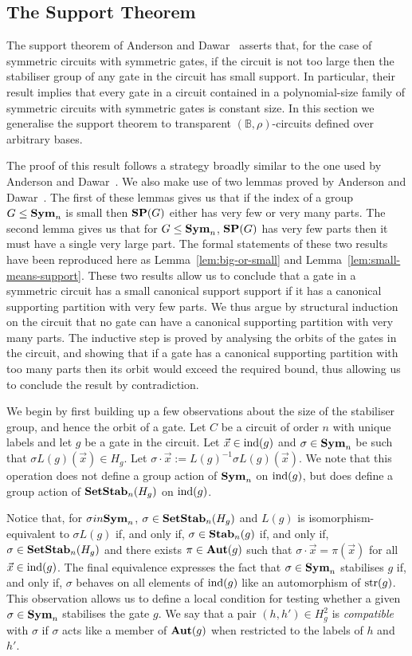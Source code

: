 \documentclass[../paper.tex]{subfiles}
\begin{document}
\subsection{The Support Theorem}
The support theorem of Anderson and Dawar~\cite{AndersonD17} asserts that, for
the case of symmetric circuits with symmetric gates, if the circuit is not too
large then the stabiliser group of any gate in the circuit has small support. In
particular, their result implies that every gate in a circuit contained in a
polynomial-size family of symmetric circuits with symmetric gates is constant
size. In this section we generalise the support theorem to transparent
$(\mathbb{B}, \rho)$-circuits defined over arbitrary bases.

The proof of this result follows a strategy broadly similar to the one used by
Anderson and Dawar~\cite{AndersonD17}. We also make use of two lemmas proved by
Anderson and Dawar~\cite{AndersonD17}. The first of these lemmas gives us that
if the index of a group $G \leq \text{\textbf{Sym}}_n$ is small then $\text{\textbf{SP}}(G)$ either has very
few or very many parts. The second lemma gives us that for $G \leq \text{\textbf{Sym}}_n$,
$\text{\textbf{SP}}(G)$ has very few parts then it must have a single very large part. The
formal statements of these two results have been reproduced here as
Lemma~\ref{lem:big-or-small} and Lemma~\ref{lem:small-means-support}. These two
results allow us to conclude that a gate in a symmetric circuit has a small
canonical support support if it has a canonical supporting partition with very
few parts. We thus argue by structural induction on the circuit that no gate can
have a canonical supporting partition with very many parts. The inductive step
is proved by analysing the orbits of the gates in the circuit, and showing that
if a gate has a canonical supporting partition with too many parts then its
orbit would exceed the required bound, thus allowing us to conclude the result
by contradiction.

We begin by first building up a few observations about the size of the
stabiliser group, and hence the orbit of a gate. Let $C$ be a circuit of order
$n$ with unique labels and let $g$ be a gate in the circuit. Let $\vec{x} \in
\text{\upshape ind}(g)$ and $\sigma \in \text{\textbf{Sym}}_n$ be such that $\sigma L(g)(\vec{x}) \in H_g$.
Let $\sigma \cdot \vec{x} := L(g)^{-1}\sigma L(g)(\vec{x})$. We note that this
operation does not define a group action of $\text{\textbf{Sym}}_n$ on $\text{\upshape ind}(g)$, but does
define a group action of $\text{\textbf{SetStab}}_n(H_g)$ on $\text{\upshape ind}(g)$.

Notice that, for $\sigma in \text{\textbf{Sym}}_n$, $\sigma \in \text{\textbf{SetStab}}_n(H_g)$ and $L(g)$ is
isomorphism-equivalent to $\sigma L(g)$ if, and only if, $\sigma \in \text{\textbf{Stab}}_n(g)$
if, and only if, $\sigma \in \text{\textbf{SetStab}}_n(H_g)$ and there exists $\pi \in \text{\textbf{Aut}}(g)$
such that $\sigma \cdot \vec{x} = \pi (\vec{x})$ for all $\vec{x} \in \text{\upshape ind}(g)$.
The final equivalence expresses the fact that $\sigma \in \text{\textbf{Sym}}_n$ stabilises $g$
if, and only if, $\sigma$ behaves on all elements of $\text{\upshape ind}(g)$ like an
automorphism of $\text{str}(g)$. This observation allows us to define a local
condition for testing whether a given $\sigma \in \text{\textbf{Sym}}_n$ stabilises the gate
$g$. We say that a pair $(h, h') \in H^{2}_g$ is \emph{compatible} with $\sigma$
if $\sigma$ acts like a member of $\text{\textbf{Aut}}(g)$ when restricted to the labels of $h$
and $h'$.
\end{document}
